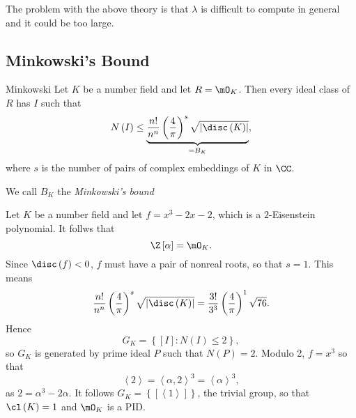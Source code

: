 \documentclass[pmath441]{subfiles}
\begin{document}
    \np The problem with the above theory is that $\lambda$ is difficult to compute in general and it could be too large.
    
    \subsection{Minkowski's Bound}
    
    \begin{theorem}{Minkowski}
        Let $K$ be a number field and let $R=\mO_K$. Then every ideal class of $R$ has $I$ such that
        \begin{equation*}
            N\left( I \right) \leq \underbrace{\frac{n!}{n^n} \left( \frac{4}{\pi} \right)^s\sqrt{\left| \disc\left( K \right) \right|}}_{=B_K},
        \end{equation*}
        where $s$ is the number of pairs of complex embeddings of $K$ in $\CC$.
    \end{theorem}

    \placeqed[Assignment 5]

    \np We call $B_K$ the \emph{Minkowski's bound}

    \begin{example}{}
        Let $K$ be a number field and let $f=x^{3}-2x-2$, which is a $2$-Eisenstein polynomial. It follws that
        \begin{equation*}
            \Z\left[ \alpha \right] = \mO_K.
        \end{equation*}
        Since $\disc\left( f \right)<0$, $f$ must have a pair of nonreal roots, so that $s=1$. This means
        \begin{equation*}
            \frac{n!}{n^n} \left( \frac{4}{\pi} \right)^s\sqrt{\left| \disc\left( K \right) \right|} = \frac{3!}{3^3}\left( \frac{4}{\pi} \right)^1\sqrt{76}.
        \end{equation*}
        Hence
        \begin{equation*}
            G_K = \left\lbrace \left[ I \right]:N\left( I \right)\leq 2 \right\rbrace,
        \end{equation*}
        so $G_K$ is generated by prime ideal $P$ such that $N\left( P \right) = 2$. Modulo 2, $f=x^{3}$ so that
        \begin{equation*}
            \left< 2 \right> = \left< \alpha,2 \right>^{3} = \left< \alpha \right>^{3}, 
        \end{equation*}
        as $2=\alpha^{3}-2\alpha$. It follows $G_K = \left\lbrace \left[ \left< 1 \right>  \right] \right\rbrace$, the trivial group, so that $\cl\left( K \right) = 1$ and $\mO_K$ is a PID.
    \end{example}
    
\end{document}
